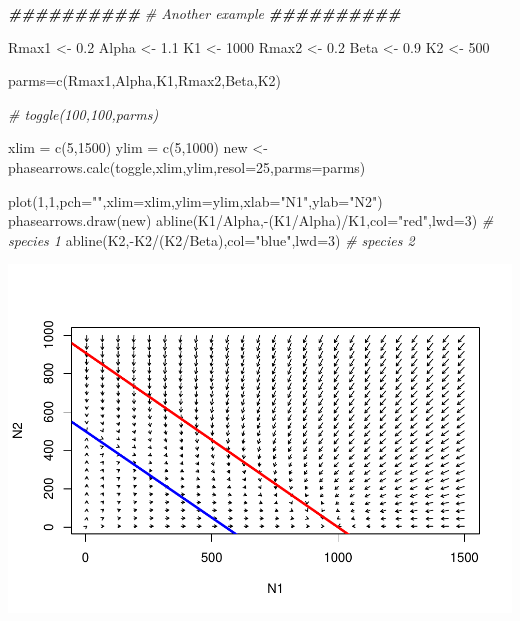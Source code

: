 \documentclass[
]{article}
\newenvironment{Shaded}{\begin{snugshade}}{\end{snugshade}}
\newcommand{\AttributeTok}[1]{\textcolor[rgb]{0.77,0.63,0.00}{#1}}
\newcommand{\CommentTok}[1]{\textcolor[rgb]{0.56,0.35,0.01}{\textit{#1}}}
\newcommand{\DecValTok}[1]{\textcolor[rgb]{0.00,0.00,0.81}{#1}}
\newcommand{\DocumentationTok}[1]{\textcolor[rgb]{0.56,0.35,0.01}{\textbf{\textit{#1}}}}
\newcommand{\FloatTok}[1]{\textcolor[rgb]{0.00,0.00,0.81}{#1}}
\newcommand{\FunctionTok}[1]{\textcolor[rgb]{0.00,0.00,0.00}{#1}}
\newcommand{\NormalTok}[1]{#1}
\newcommand{\OtherTok}[1]{\textcolor[rgb]{0.56,0.35,0.01}{#1}}
\newcommand{\SpecialCharTok}[1]{\textcolor[rgb]{0.00,0.00,0.00}{#1}}
\newcommand{\StringTok}[1]{\textcolor[rgb]{0.31,0.60,0.02}{#1}}
\begin{document}
\begin{Shaded}
\begin{Highlighting}[]
\DocumentationTok{\#\#\#\#\#\#\#\#\#\#}
\CommentTok{\# Another example}
\DocumentationTok{\#\#\#\#\#\#\#\#\#\#}

\NormalTok{Rmax1 }\OtherTok{\textless{}{-}} \FloatTok{0.2}
\NormalTok{Alpha }\OtherTok{\textless{}{-}} \FloatTok{1.1}
\NormalTok{K1 }\OtherTok{\textless{}{-}} \DecValTok{1000}
\NormalTok{Rmax2 }\OtherTok{\textless{}{-}} \FloatTok{0.2}
\NormalTok{Beta }\OtherTok{\textless{}{-}} \FloatTok{0.9}
\NormalTok{K2 }\OtherTok{\textless{}{-}} \DecValTok{500}

\NormalTok{parms}\OtherTok{=}\FunctionTok{c}\NormalTok{(Rmax1,Alpha,K1,Rmax2,Beta,K2)}

\CommentTok{\# toggle(100,100,parms)}

\NormalTok{xlim }\OtherTok{=} \FunctionTok{c}\NormalTok{(}\DecValTok{5}\NormalTok{,}\DecValTok{1500}\NormalTok{)}
\NormalTok{ylim }\OtherTok{=} \FunctionTok{c}\NormalTok{(}\DecValTok{5}\NormalTok{,}\DecValTok{1000}\NormalTok{)}
\NormalTok{new }\OtherTok{\textless{}{-}} \FunctionTok{phasearrows.calc}\NormalTok{(toggle,xlim,ylim,}\AttributeTok{resol=}\DecValTok{25}\NormalTok{,}\AttributeTok{parms=}\NormalTok{parms)}

\FunctionTok{plot}\NormalTok{(}\DecValTok{1}\NormalTok{,}\DecValTok{1}\NormalTok{,}\AttributeTok{pch=}\StringTok{""}\NormalTok{,}\AttributeTok{xlim=}\NormalTok{xlim,}\AttributeTok{ylim=}\NormalTok{ylim,}\AttributeTok{xlab=}\StringTok{"N1"}\NormalTok{,}\AttributeTok{ylab=}\StringTok{"N2"}\NormalTok{)}
\FunctionTok{phasearrows.draw}\NormalTok{(new)}
\FunctionTok{abline}\NormalTok{(K1}\SpecialCharTok{/}\NormalTok{Alpha,}\SpecialCharTok{{-}}\NormalTok{(K1}\SpecialCharTok{/}\NormalTok{Alpha)}\SpecialCharTok{/}\NormalTok{K1,}\AttributeTok{col=}\StringTok{"red"}\NormalTok{,}\AttributeTok{lwd=}\DecValTok{3}\NormalTok{)   }\CommentTok{\# species 1}
\FunctionTok{abline}\NormalTok{(K2,}\SpecialCharTok{{-}}\NormalTok{K2}\SpecialCharTok{/}\NormalTok{(K2}\SpecialCharTok{/}\NormalTok{Beta),}\AttributeTok{col=}\StringTok{"blue"}\NormalTok{,}\AttributeTok{lwd=}\DecValTok{3}\NormalTok{)   }\CommentTok{\# species 2}
\end{Highlighting}
\end{Shaded}

\includegraphics{LECTURE16_files/figure-latex/unnamed-chunk-13-1.pdf}
\end{document}

